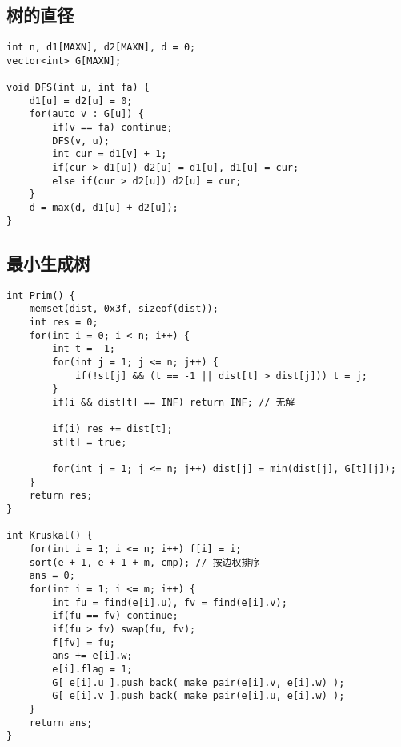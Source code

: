 \subsection{树的直径}
\begin{lstlisting}
int n, d1[MAXN], d2[MAXN], d = 0;
vector<int> G[MAXN];

void DFS(int u, int fa) {
	d1[u] = d2[u] = 0;
	for(auto v : G[u]) {
		if(v == fa) continue;
		DFS(v, u);
		int cur = d1[v] + 1;
		if(cur > d1[u]) d2[u] = d1[u], d1[u] = cur;
		else if(cur > d2[u]) d2[u] = cur;
	} 
	d = max(d, d1[u] + d2[u]);
}
\end{lstlisting}

\subsection{最小生成树}
\begin{lstlisting}
int Prim() {
	memset(dist, 0x3f, sizeof(dist));
	int res = 0;
	for(int i = 0; i < n; i++) {
		int t = -1;
		for(int j = 1; j <= n; j++) {
			if(!st[j] && (t == -1 || dist[t] > dist[j])) t = j;
		}
		if(i && dist[t] == INF) return INF;	// 无解 
		
		if(i) res += dist[t];
		st[t] = true;
		
		for(int j = 1; j <= n; j++) dist[j] = min(dist[j], G[t][j]);
	}
	return res;
}

int Kruskal() {
	for(int i = 1; i <= n; i++) f[i] = i;
	sort(e + 1, e + 1 + m, cmp); // 按边权排序
	ans = 0;
	for(int i = 1; i <= m; i++) {
		int fu = find(e[i].u), fv = find(e[i].v);
		if(fu == fv) continue;
		if(fu > fv) swap(fu, fv);
		f[fv] = fu;
		ans += e[i].w;
		e[i].flag = 1;
		G[ e[i].u ].push_back( make_pair(e[i].v, e[i].w) );
		G[ e[i].v ].push_back( make_pair(e[i].u, e[i].w) );
	}
	return ans;
}
\end{lstlisting}

